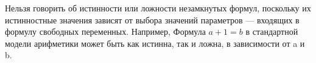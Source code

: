 \begin{remark}
Нельзя говорить об истинности или ложности незамкнутых
формул, поскольку их истинностные значения зависят от выбора значений параметров — входящих в формулу свободных переменных. Например, Формула $a+1 = b$  в стандартной модели арифметики может
быть как истинна, так и ложна, в зависимости от a и b.
\end{remark}
